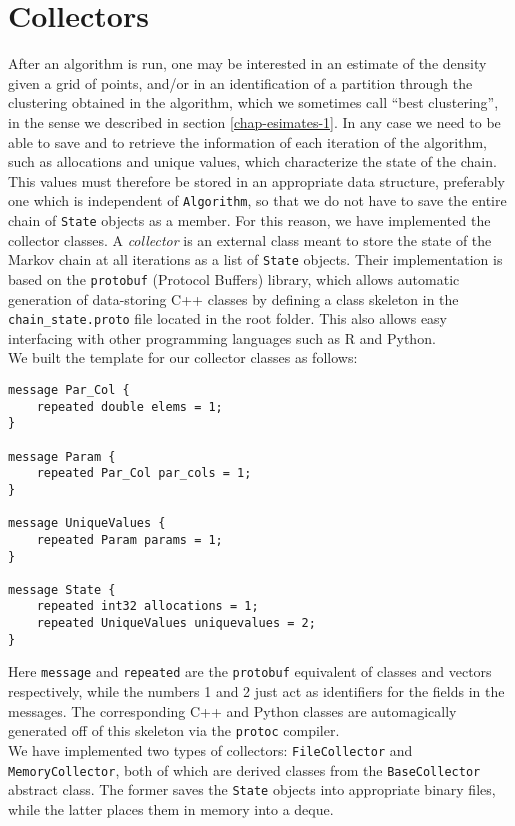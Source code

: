 \section{Collectors}\label{collectors}
After an algorithm is run, one may be interested in an estimate of the density given a grid of points, and/or in an identification of a partition through the clustering obtained in the algorithm, which we sometimes call ``best clustering'', in the sense we described in section \ref{chap-esimates-1}.
In any case we need to be able to save and to retrieve the information of each iteration of the algorithm, such as allocations and unique values, which characterize the state of the chain.
This values must therefore be stored in an appropriate data structure, preferably one which is independent of \verb|Algorithm|, so that we do not have to save the entire chain of \verb|State| objects as a member.
For this reason, we have implemented the collector classes.
A \emph{collector} is an external class meant to store the state of the Markov chain at all iterations as a list of \verb|State| objects.
Their implementation is based on the \verb|protobuf| (Protocol Buffers) library, which allows automatic generation of data-storing C++ classes by defining a class skeleton in the \verb|chain_state.proto| file located in the root folder.
This also allows easy interfacing with other programming languages such as R and Python. \\
We built the template for our collector classes as follows:
\begin{verbatim}
message Par_Col {
    repeated double elems = 1;
}

message Param {
    repeated Par_Col par_cols = 1;
}

message UniqueValues {
    repeated Param params = 1;
}

message State {
    repeated int32 allocations = 1;
    repeated UniqueValues uniquevalues = 2;
}
\end{verbatim}
Here \verb|message| and \verb|repeated| are the \verb|protobuf| equivalent of classes and vectors respectively, while the numbers 1 and 2 just act as identifiers for the fields in the messages.
The corresponding C++ and Python classes are automagically generated off of this skeleton via the \verb|protoc| compiler. \\
We have implemented two types of collectors: \verb|FileCollector| and \verb|MemoryCollector|, both of which are derived classes from the \verb|BaseCollector| abstract class.
The former saves the \verb|State| objects into appropriate binary files, while the latter places them in memory into a deque.
